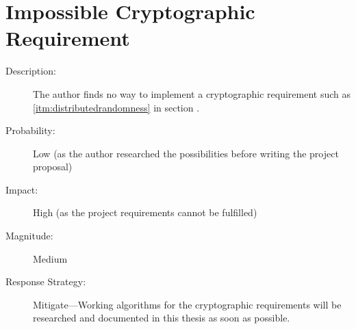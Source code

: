 \section{Impossible Cryptographic Requirement}

\begin{description}
  \item[Description:] The author finds no way to implement a cryptographic
  requirement such as \ref{itm:distributedrandomness} in section
  .
  \item[Probability:] Low (as the author researched the possibilities before
  writing the project proposal)
  \item[Impact:] High (as the project requirements cannot be fulfilled)
  \item[Magnitude:] Medium
  \item[Response Strategy:] Mitigate---Working algorithms for the cryptographic
  requirements will be researched and documented in this thesis as soon as
  possible.
\end{description}
